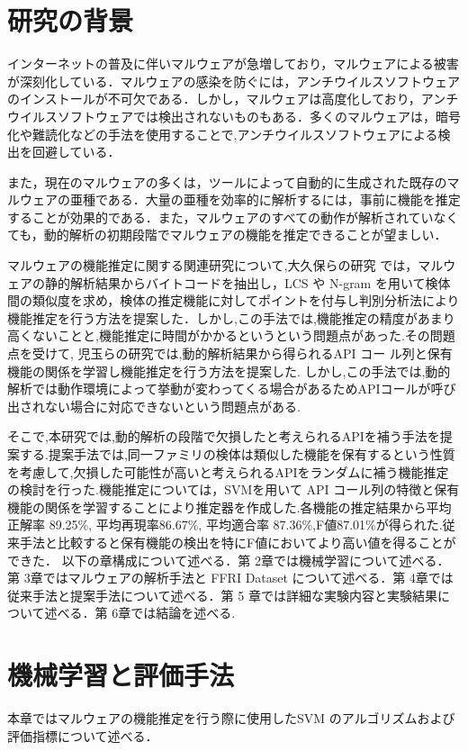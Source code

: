 \documentclass{thesis}
\begin{document}
\tableofcontents

\chapter{研究の背景}

インターネットの普及に伴いマルウェアが急増しており，マルウェアによる被害が深刻化している．マルウェアの感染を防ぐには，アンチウイルスソフトウェアのインストールが不可欠である．しかし，マルウェアは高度化しており，アンチウイルスソフトウェアでは検出されないものもある．多くのマルウェアは，暗号化や難読化などの手法を使用することで,アンチウイルスソフトウェアによる検出を回避している．


また，現在のマルウェアの多くは，ツールによって自動的に生成された既存のマルウェアの亜種である．大量の亜種を効率的に解析するには，事前に機能を推定することが効果的である．また，マルウェアのすべての動作が解析されていなくても，動的解析の初期段階でマルウェアの機能を推定できることが望ましい．



マルウェアの機能推定に関する関連研究について,大久保らの研究 \cite{okubo} では，マルウェアの静的解析結果からバイトコードを抽出し，LCS や N-gram を用いて検体間の類似度を求め，検体の推定機能に対してポイントを付与し判別分析法により機能推定を行う方法を提案した．しかし,この手法では,機能推定の精度があまり高くないことと,機能推定に時間がかかるというという問題点があった.その問題点を受けて,
児玉らの研究\cite{pre1}では,動的解析結果から得られるAPI コー ル列と保有機能の関係を学習し機能推定を行う方法を提案した.
しかし,この手法では,動的解析では動作環境によって挙動が変わってくる場合があるためAPIコールが呼び出されない場合に対応できないという問題点がある.


そこで,本研究では,動的解析の段階で欠損したと考えられるAPIを補う手法を提案する.提案手法では,同一ファミリの検体は類似した機能を保有するという性質を考慮して,欠損した可能性が高いと考えられるAPIをランダムに補う機能推定の検討を行った.機能推定については，SVMを用いて API コール列の特徴と保有機能の関係を学習することにより推定器を作成した.各機能の推定結果から平均正解率 89.25\%,
平均再現率86.67\%, 平均適合率 87.36\%,F値87.01\%が得られた.従来手法と比較すると保有機能の検出を特にF値においてより高い値を得ることができた．
以下の章構成について述べる．第 2章では機械学習について述べる．第 3章ではマルウェアの解析手法と FFRI Dataset について述べる．第 4章では従来手法と提案手法について述べる．第 5 章では詳細な実験内容と実験結果について述べる．第 6章では結論を述べる.

\chapter{機械学習と評価手法}
本章ではマルウェアの機能推定を行う際に使用したSVM \cite{機械学習} のアルゴリズムおよび評価指標について述べる．
\end{document}
